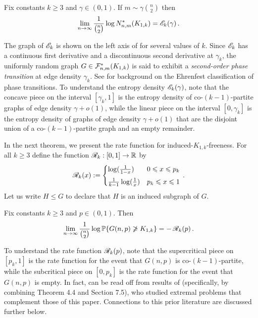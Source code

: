 \begin{theorem}\label{thm:main-entropy}
Fix constants $k\geq3$ and $\gamma\in(0,1)$. If $m\sim\gamma\binom{n}{2}$ then
\begin{equation*}
\lim_{n\to\infty}\frac{1}{\binom{n}{2}}\log N^\ast_{n,m}(K_{1,k})={\mathscr E}_k(\gamma) \,.
\end{equation*}
\end{theorem}

The graph of ${\mathscr E}_k$ is shown on the left axis of  for several values of $k$. Since ${\mathscr E}_k$ has a continuous first derivative and a discontinuous second derivative at $\gamma_k$, the uniformly random graph $G\in{\mathcal F}^\ast_{n,m}(K_{1,k})$ is said to exhibit a \emph{second-order phase transition} at edge density $\gamma_k$. See \cite{jaeger1998ehrenfest} for background on the Ehrenfest classification of phase transitions. To understand the entropy density ${\mathscr E}_k(\gamma)$, note that the concave piece on the interval $[\gamma_k,1]$ is the entropy density of co-$(k-1)$-partite graphs of edge density $\gamma+o(1)$, while the linear piece on the interval $[0,\gamma_k]$ is the entropy density of graphs of edge density $\gamma+o(1)$ that are the disjoint union of a co-$(k-1)$-partite graph and an empty remainder.

In the next theorem, we present the rate function for induced-$K_{1,k}$-freeness. For all $k\geq3$ define the function ${\mathscr R}_k:[0,1]\to{\mathbb R}$ by
$${\mathscr R}_k(x):=\begin{cases}\log(\frac{1}{1-x})&0\leqslant x\leqslant p_k\\[4pt]\frac{1}{k-1}\log(\frac{1}{x})&p_k\leqslant x\leqslant1\end{cases}\,.$$
Let us write $H\leq G$ to declare that $H$ is an induced subgraph of $G$.

\begin{theorem}\label{thm:main-rate}
Fix constants $k\geq3$ and $p\in(0,1)$. Then
\begin{equation*}
\lim_{n\to\infty}\frac{1}{\binom{n}{2}}\log{\mathbb P}\{G(n,p)\not\geqslant K_{1,k}\}=-\,{\mathscr R}_k(p) \,.
\end{equation*}
\end{theorem}

To understand the rate function ${\mathscr R}_k(p)$, note that the supercritical piece on $[p_k,1]$ is the rate function for the event that $G(n,p)$ is co-$(k-1)$-partite, while the subcritical piece on $[0,p_k]$ is the rate function for the event that $G(n,p)$ is empty. In fact,  can be read off from results of \citeauthor{thomason2011graphs} \cite{thomason2011graphs} (specifically, by combining Theorem 4.4 and Section 7.5), who studied extremal problems that complement those of this paper. Connections to this prior literature are discussed further below.

